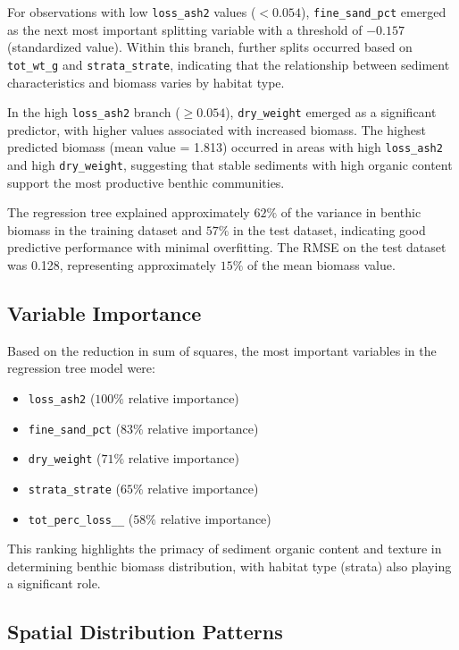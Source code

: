 \documentclass[12pt]{article}
\begin{document}
\qquad For observations with low \texttt{loss\_ash2} values ($<0.054$),
\texttt{fine\_sand\_pct} emerged as the next most important splitting variable
with a threshold of $-0.157$ (standardized value). Within this branch, further
splits occurred based on \texttt{tot\_wt\_g} and \texttt{strata\_strate},
indicating that the relationship between sediment characteristics and biomass
varies by habitat type.

\qquad In the high \texttt{loss\_ash2} branch ($\geq0.054$),
\texttt{dry\_weight} emerged as a significant predictor, with higher values
associated with increased biomass. The highest predicted biomass (mean value =
1.813) occurred in areas with high \texttt{loss\_ash2} and high
\texttt{dry\_weight}, suggesting that stable sediments with high organic content
support the most productive benthic communities.

\qquad The regression tree explained approximately $62\%$ of the variance in
benthic biomass in the training dataset and $57\%$ in the test dataset,
indicating good predictive performance with minimal overfitting. The RMSE on the
test dataset was 0.128, representing approximately $15\%$ of the mean biomass
value.

\subsection{Variable Importance}

\qquad Based on the reduction in sum of squares, the most important variables in
the regression tree model were:

\begin{itemize}
    \item \texttt{loss\_ash2} ($100\%$ relative importance)
    \item \texttt{fine\_sand\_pct} ($83\%$ relative importance)
    \item \texttt{dry\_weight} ($71\%$ relative importance)
    \item \texttt{strata\_strate} ($65\%$ relative importance)
    \item \texttt{tot\_perc\_loss\_\_} ($58\%$ relative importance)
\end{itemize}

\qquad This ranking highlights the primacy of sediment organic content and
texture in determining benthic biomass distribution, with habitat type (strata)
also playing a significant role.

\subsection{Spatial Distribution Patterns}
\end{document}
